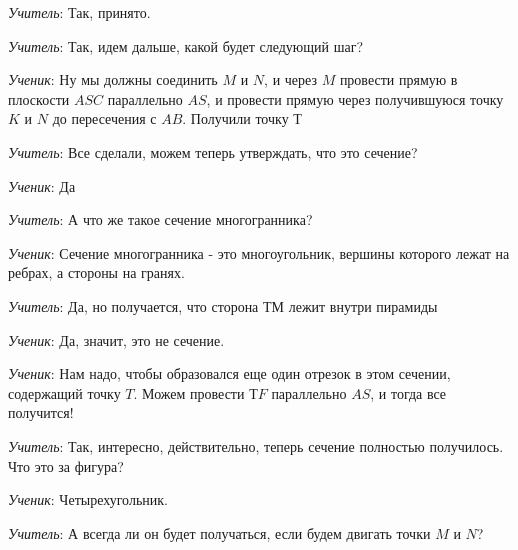 \documentclass[a4paper,14pt,russian]{extreport}
\begin{document}
\textit{Учитель}: Так, принято.

\begin{center}
        \begin{minipage}{\textwidth}
            \centering
        \end{minipage}
\end{center}

\textit{Учитель}: Так, идем дальше, какой будет следующий шаг?

\textit{Ученик}: Ну мы должны соединить $M$ и $N$, и через $M$ провести прямую в плоскости $ASC$ параллельно $AS$, и провести прямую через получившуюся точку $K$ и $N$ до пересечения с $AB$. Получили точку Т

\textit{Учитель}: Все сделали, можем теперь утверждать, что это сечение?

\textit{Ученик}: Да

\textit{Учитель}: А что же такое сечение многогранника?

\textit{Ученик}: Сечение многогранника - это многоугольник, вершины которого лежат на ребрах, а стороны на гранях.

\textit{Учитель}: Да, но получается, что сторона $ТМ$ лежит внутри пирамиды

\textit{Ученик}: Да, значит, это не сечение.

\textit{Ученик}: Нам надо, чтобы образовался еще один отрезок в этом сечении, содержащий точку $T$. Можем провести $ТF$ параллельно $AS$, и тогда все получится!


\begin{center}
    \begin{minipage}{\textwidth}
        \centering
    \end{minipage}
\end{center}

\textit{Учитель}: Так, интересно, действительно, теперь сечение полностью получилось. Что это за фигура?

\textit{Ученик}: Четырехугольник.

\textit{Учитель}: А всегда ли он будет получаться, если будем двигать точки $M$ и $N$?
\end{document}
